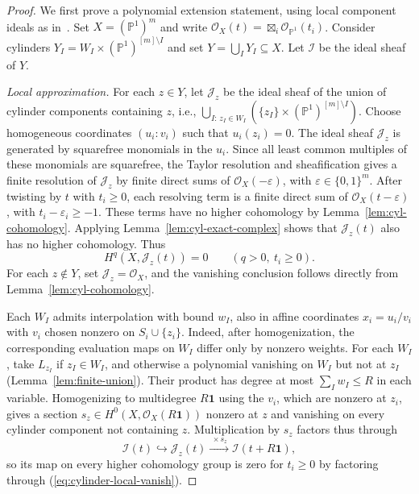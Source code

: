 \documentclass[11pt,letterpaper]{article}
\renewcommand{\le}{\leqslant}
\renewcommand{\ge}{\geqslant}
\theoremstyle{definition}
\theoremstyle{remark}
\newcommand{\PP}{\mathbb P}
\newcommand{\cO}{\mathcal O}
\begin{document}
\begin{proof}
We first prove a polynomial extension statement, using local
component ideals as in~\cite{DerksenSidman2004}.
Set $X=(\PP^1)^m$ and write
$\cO_X(t)=\boxtimes_i\cO_{\PP^1}(t_i)$.
Consider cylinders $Y_I=W_I\times(\PP^1)^{[m]\setminus I}$ and set $Y=\bigcup_I Y_I \subseteq X$. Let $\mathcal I$ be the ideal sheaf of $Y$. 

\emph{Local approximation.}
For each $z\in Y$, let $\mathcal J_z$ be the ideal sheaf of the union of cylinder
components containing $z$, i.e., 
$\bigcup_{I:\,z_I\in W_I}
\left(\{z_I\}\times(\PP^1)^{[m]\setminus I}\right)$.
Choose homogeneous coordinates $(u_i:v_i)$ such that
$u_i(z_i)=0$. The ideal sheaf $\mathcal J_z$
is generated by squarefree monomials in the $u_i$.
Since all least common multiples of these monomials are
squarefree, the Taylor resolution \cite[Section~2]{BPS98}
and sheafification gives a finite resolution of $\mathcal J_z$ by finite direct
sums of $\cO_X(-\varepsilon)$, with $\varepsilon\in\{0,1\}^m$.
After twisting by $t$ with $t_i\ge0$, each resolving term
is a finite direct sum of $\cO_X(t-\varepsilon)$,
with $t_i-\varepsilon_i\ge-1$.
These terms have no higher cohomology by
Lemma~\ref{lem:cyl-cohomology}.
Applying Lemma~\ref{lem:cyl-exact-complex}
shows that $\mathcal J_z(t)$ also has no higher cohomology.
Thus
\begin{equation}
    H^q(X,\mathcal J_z(t))=0
\qquad(q>0,\ t_i\ge0).
    \label{eq:cylinder-local-vanish}
\end{equation}
For each $z \notin Y$, set $\mathcal J_z=\cO_X$,
and the vanishing conclusion follows directly from
Lemma~\ref{lem:cyl-cohomology}.

Each $W_I$ admits interpolation with bound $w_I$,
also in affine coordinates $x_i=u_i/v_i$ with $v_i$
chosen nonzero on $S_i\cup\{z_i\}$.
Indeed, after homogenization, the corresponding evaluation
maps on $W_I$ differ only by nonzero weights.
For each $W_I$, take $L_{z_I}$ if $z_I\in W_I$,
and otherwise a polynomial vanishing on $W_I$
but not at $z_I$ (Lemma~\ref{lem:finite-union}).
Their product has degree at most $\sum_I w_I\le R$
in each variable.
Homogenizing to multidegree $R\mathbf1$ using the $v_i$,
which are nonzero at $z_i$, gives a section
$s_z\in H^0(X,\cO_X(R\mathbf1))$ nonzero at $z$
and vanishing on every cylinder component not containing $z$. Multiplication by $s_z$ factors thus through
\[
 \mathcal I(t)\hookrightarrow\mathcal J_z(t)
       \xrightarrow{\ \times s_z\ }\mathcal I(t+R\mathbf1),
\]
so its map on every higher cohomology group is zero for $t_i\ge0$ by factoring through (\ref{eq:cylinder-local-vanish}).


\end{proof}
\end{document}
